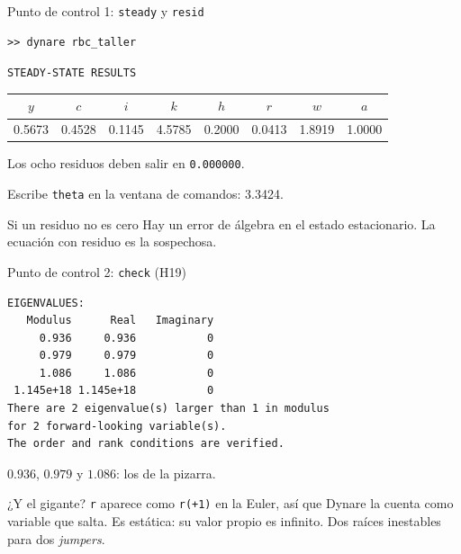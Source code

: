 \begin{frame}[fragile,label=control1]{Punto de control 1: \texttt{steady} y \texttt{resid}}
  \begin{lstlisting}[language={}]
>> dynare rbc_taller
\end{lstlisting}
  \vspace{0.1cm}
  \centering\small
  \texttt{STEADY-STATE RESULTS}\par\vspace{0.1cm}
  \begin{tabular}{@{}cccccccc@{}}
    \toprule
    $y$ & $c$ & $i$ & $k$ & $h$ & $r$ & $w$ & $a$\\
    \midrule
    0.5673 & 0.4528 & 0.1145 & 4.5785 & 0.2000 & 0.0413 & 1.8919 & 1.0000\\
    \bottomrule
  \end{tabular}
  \par\vspace{0.35cm}\raggedright\normalsize
  Los ocho residuos deben salir en \texttt{0.000000}.\par
  \vspace{0.2cm}
  Escribe \texttt{theta} en la ventana de comandos: \num{3.3424}.\par
  \vspace{0.3cm}
  \begin{block}{Si un residuo no es cero}
    Hay un error de álgebra en el estado estacionario. La ecuación con residuo es la
    sospechosa.
  \end{block}
\end{frame}

\begin{frame}[fragile,label=control2]{Punto de control 2: \texttt{check} (H19)}
  \begin{lstlisting}[language={}]
EIGENVALUES:
   Modulus      Real   Imaginary
     0.936     0.936           0
     0.979     0.979           0
     1.086     1.086           0
 1.145e+18 1.145e+18           0
There are 2 eigenvalue(s) larger than 1 in modulus
for 2 forward-looking variable(s).
The order and rank conditions are verified.
\end{lstlisting}
  \vspace{0.15cm}
  $0.936$, $0.979$ y $1.086$: los de la pizarra.\par
  \vspace{0.15cm}
  ¿Y el gigante? \texttt{r} aparece como \texttt{r(+1)} en la Euler, así que Dynare la
  cuenta como variable que salta. Es estática: su valor propio es infinito. Dos raíces
  inestables para dos \emph{jumpers}.
\end{frame}

